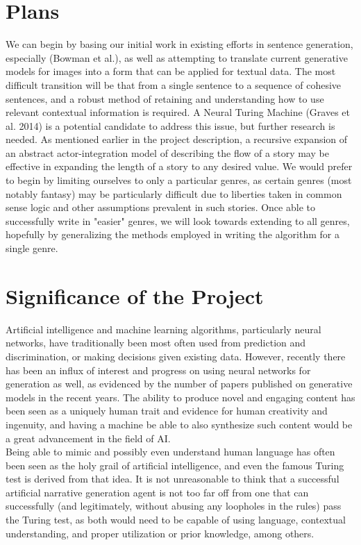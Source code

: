 \documentclass[letter]{article}
\newcommand\tab[1][1cm]{\hspace*{#1}}
\begin{document}
\section{Plans}
\tab We can begin by basing our initial work in existing efforts in sentence generation, especially (Bowman et al.), as well as attempting to translate current generative models for images into a form that can be applied for textual data. The most difficult transition will be that from a single sentence to a sequence of cohesive sentences, and a robust method of retaining and understanding how to use relevant contextual information is required. A Neural Turing Machine (Graves et al. 2014) is a potential candidate to address this issue, but further research is needed. As mentioned earlier in the project description, a recursive expansion of an abstract actor-integration model of describing the flow of a story may be effective in expanding the length of a story to any desired value. We would prefer to begin by limiting ourselves to only a particular genres, as certain genres (most notably fantasy) may be particularly difficult due to liberties taken in common sense logic and other assumptions prevalent in such stories. Once able to successfully write in "easier" genres, we will look towards extending to all genres, hopefully by generalizing the methods employed in writing the algorithm for a single genre. 
\section{Significance of the Project}
\tab Artificial intelligence and machine learning algorithms, particularly neural networks, have traditionally been most often used from prediction and discrimination, or making decisions given existing data. However, recently there has been an influx of interest and progress on using neural networks for generation as well, as evidenced by the number of papers published on generative models in the recent years. The ability to produce novel and engaging content has been seen as a uniquely human trait and evidence for human creativity and ingenuity, and having a machine be able to also synthesize such content would be a great advancement in the field of AI.\\
\tab Being able to mimic and possibly even understand human language has often been seen as the holy grail of artificial intelligence, and even the famous Turing test is derived from that idea. It is not unreasonable to think that a successful artificial narrative generation agent is not too far off from one that can successfully (and legitimately, without abusing any loopholes in the rules) pass the Turing test, as both would need to be capable of using language, contextual understanding, and proper utilization or prior knowledge, among others.
\end{document}
